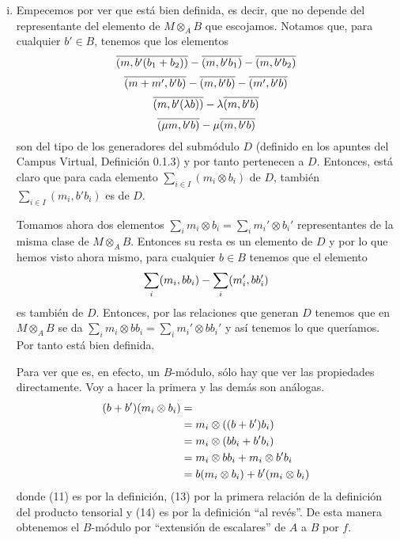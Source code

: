 \documentclass[../../../main.tex]{subfiles}
\begin{document}
\begin{sol}
\begin{enumerate}[(i)]
    \item Empecemos por ver que está bien definida, es decir, que no depende del representante del elemento de $M\otimes_AB$ que escojamos. Notamos que, para cualquier $b'\in B$, tenemos que los elementos
    \begin{equation}
        \notag
        \overline{(m,b'(b_1+b_2))}-\overline{(m,b'b_1)}-\overline{(m,b'b_2)}
    \end{equation}
    \begin{equation}
        \notag
        \overline{(m+m',b'b)}-\overline{(m,b'b)}-\overline{(m',b'b)}
    \end{equation}
    \begin{equation}
        \notag
        \overline{(m,b'(\lambda b))}-\lambda\overline{(m,b'b)}
    \end{equation}
    \begin{equation}
        \notag
        \overline{(\mu m,b'b)}-\mu\overline{(m,b'b)}
    \end{equation}
    son del tipo de los generadores del submódulo $D$ (definido en los apuntes del Campus Virtual, Definición 0.1.3) y por tanto pertenecen a $D$. Entonces, está claro que para cada elemento $\sum_{i\in I}(m_i\otimes b_i)$ de $D$, también $\sum_{i\in I}(m_i,b'b_i)$ es de $D$.
    
    Tomamos ahora dos elementos $\sum_i m_i\otimes b_i = \sum_im_i'\otimes b_i'$ representantes de la misma clase de $M\otimes_AB$. Entonces su resta es un elemento de $D$ y por lo que hemos visto ahora mismo, para cualquier $b\in B$ tenemos que el elemento
    \begin{equation}
        \notag
        \sum_i (m_i, bb_i) - \sum_i(m_i', bb_i')
    \end{equation}
    es también de $D$. Entonces, por las relaciones que generan $D$ tenemos que en $M\otimes_AB$ se da $\sum_i m_i\otimes bb_i = \sum_im_i'\otimes bb_i'$ y así tenemos lo que queríamos. Por tanto está bien definida.
    
    Para ver que es, en efecto, un $B$-módulo, sólo hay que ver las propiedades directamente. Voy a hacer la primera y las demás son análogas.
    \begin{align}
        \notag
        (b+b')(m_i\otimes b_i) &= \\
        &= m_i\otimes((b+b')b_i) \\
        &= m_i\otimes(bb_i+b'b_i) \\
        &= m_i\otimes bb_i + m_i\otimes b'b_i \\
        &= b(m_i\otimes b_i) + b'(m_i\otimes b_i)
    \end{align}
    donde (11) es por la definición, (13) por la primera relación de la definición del producto tensorial y (14) es por la definición ``al revés''. De esta manera obtenemos el $B$-módulo por ``extensión de escalares'' de $A$ a $B$ por $f$.
    

\end{enumerate}
\end{sol}
\end{document}
